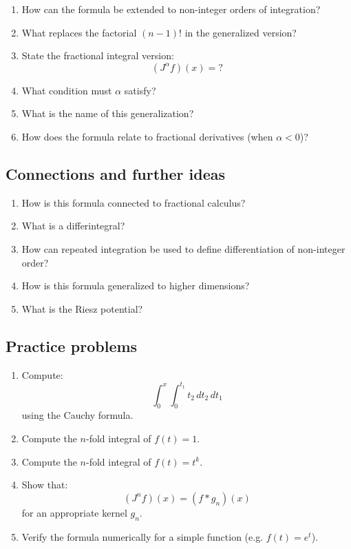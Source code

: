 \begin{enumerate}[resume]
  \item How can the formula be extended to non-integer orders of integration?
  \item What replaces the factorial \((n-1)!\) in the generalized version?
  \item State the fractional integral version:
    \[ (J^{\alpha} f)(x) = ? \]
  \item What condition must \(\alpha\) satisfy?
  \item What is the name of this generalization?
  \item How does the formula relate to fractional derivatives (when \(\alpha < 0\))?
\end{enumerate}

\subsection{Connections and further ideas}

\begin{enumerate}[resume]
  \item How is this formula connected to fractional calculus?
  \item What is a differintegral?
  \item How can repeated integration be used to define differentiation of non-integer order?
  \item How is this formula generalized to higher dimensions?
  \item What is the Riesz potential?
\end{enumerate}

\subsection{Practice problems}

\begin{enumerate}[resume]
  \item Compute:
    \[ \int_{0}^{x} \int_{0}^{t_{1}}t_{2} \, dt_{2} \, dt_{1} \]
    using the Cauchy formula.
  \item Compute the \(n\)-fold integral of \(f(t) = 1\).
  \item Compute the \(n\)-fold integral of \(f(t) = t^{k}\).
  \item Show that:
    \[ (J^{n} f)(x) = (f * g_{n})(x) \]
    for an appropriate kernel \(g_{n}\).
  \item Verify the formula numerically for a simple function (e.g. \(f(t)=e^{t}\)).
\end{enumerate}
